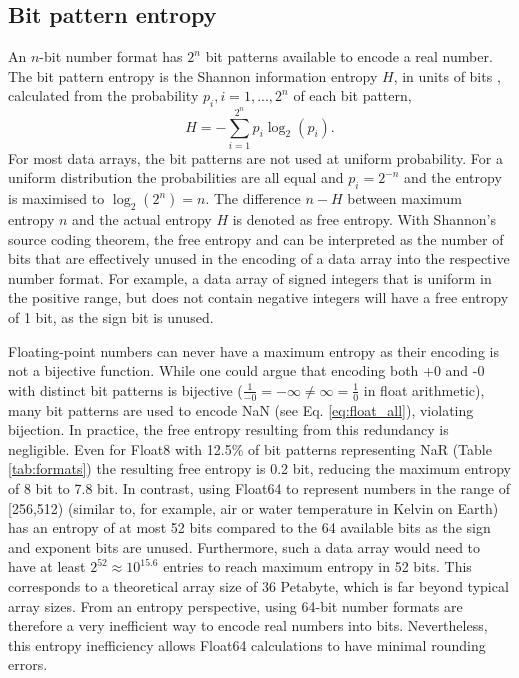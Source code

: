\subsection{Bit pattern entropy}
\label{sec:bitpattern_entropy}

An $n$-bit number format has $2^n$ bit patterns available to encode a real number. The bit pattern entropy is the
Shannon information entropy $H$, in units of bits \citep{Shannon1948}, calculated from the probability $p_i, i = 1,...,2^n$ of each bit pattern,
	\begin{equation}
	H = - \sum_{i=1}^{2^n} p_i \log_2(p_i).
	\end{equation}
For most data arrays, the bit patterns are not used at uniform probability. For a uniform distribution the probabilities are all equal and
$p_i = 2^{-n}$ and the entropy is maximised to $\log_2(2^n) = n$. The difference $n-H$ between maximum entropy $n$ and
the actual entropy $H$ is denoted as free entropy. With Shannon's source coding theorem, the free entropy and can be interpreted as
the number of bits that are effectively unused in the encoding of a data array into the respective number format. For example, a data
array of signed integers that is uniform in the positive range, but does not contain negative integers will have a free entropy of 1 bit,
as the sign bit is unused.

Floating-point numbers can never have a maximum entropy as their encoding is not a bijective function. While one could argue
that encoding both +0 and -0 with distinct bit patterns is bijective ($\tfrac{1}{-0} = -\infty \neq \infty = \tfrac{1}{0}$ in float arithmetic),
many bit patterns are used to encode NaN (see Eq. \ref{eq:float_all}), violating bijection. In practice, the free entropy resulting
from this redundancy is negligible. Even for Float8 with 12.5\% of bit patterns representing NaR (Table \ref{tab:formats}) the 
resulting free entropy is 0.2 bit, reducing the maximum entropy of 8 bit to 7.8 bit. In contrast, using Float64 to represent 
numbers in the range of [256,512) (similar to, for example, air or water temperature in Kelvin on Earth) has an entropy of at 
most 52 bits compared to the 64 available bits as the sign and exponent bits are unused. Furthermore, such a data array
would need to have at least $2^{52} \approx 10^{15.6}$ entries to reach maximum entropy in 52 bits. This corresponds to
a theoretical array size of 36 Petabyte, which is far beyond typical array sizes. From an entropy perspective, using 64-bit number
formats are therefore a very inefficient way to encode real numbers into bits. Nevertheless, this entropy inefficiency allows
Float64 calculations to have minimal rounding errors.

